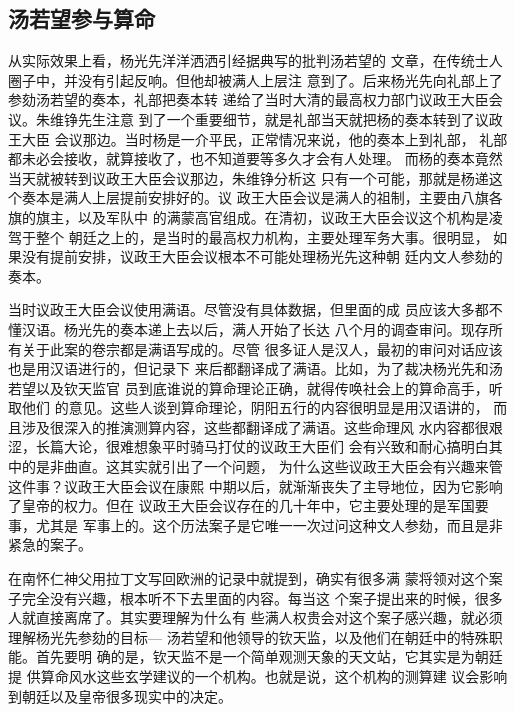 \subsection{汤若望参与算命}
\par
从实际效果上看，杨光先洋洋洒洒引经据典写的批判汤若望的%
文章，在传统士人圈子中，并没有引起反响。但他却被满人上层注%
意到了。后来杨光先向礼部上了参劾汤若望的奏本，礼部把奏本转%
递给了当时大清的最高权力部门议政王大臣会议。朱维铮先生注意%
到了一个重要细节，就是礼部当天就把杨的奏本转到了议政王大臣%
会议那边。当时杨是一介平民，正常情况来说，他的奏本上到礼部，%
礼部都未必会接收，就算接收了，也不知道要等多久才会有人处理。%
而杨的奏本竟然当天就被转到议政王大臣会议那边，朱维铮分析这%
只有一个可能，那就是杨递这个奏本是满人上层提前安排好的。议%
政王大臣会议是满人的祖制，主要由八旗各旗的旗主，以及军队中%
的满蒙高官组成。在清初，议政王大臣会议这个机构是凌驾于整个%
朝廷之上的，是当时的最高权力机构，主要处理军务大事。很明显，%
如果没有提前安排，议政王大臣会议根本不可能处理杨光先这种朝%
廷内文人参劾的奏本。%
\par
当时议政王大臣会议使用满语。尽管没有具体数据，但里面的成%
员应该大多都不懂汉语。杨光先的奏本递上去以后，满人开始了长达%
八个月的调查审问。现存所有关于此案的卷宗都是满语写成的。尽管%
很多证人是汉人，最初的审问对话应该也是用汉语进行的，但记录下%
来后都翻译成了满语。比如，为了裁决杨光先和汤若望以及钦天监官%
员到底谁说的算命理论正确，就得传唤社会上的算命高手，听取他们%
的意见。这些人谈到算命理论，阴阳五行的内容很明显是用汉语讲的，%
而且涉及很深入的推演测算内容，这些都翻译成了满语。这些命理风%
水内容都很艰涩，长篇大论，很难想象平时骑马打仗的议政王大臣们%
会有兴致和耐心搞明白其中的是非曲直。这其实就引出了一个问题，%
为什么这些议政王大臣会有兴趣来管这件事？议政王大臣会议在康熙%
中期以后，就渐渐丧失了主导地位，因为它影响了皇帝的权力。但在%
议政王大臣会议存在的几十年中，它主要处理的是军国要事，尤其是%
军事上的。这个历法案子是它唯一一次过问这种文人参劾，而且是非%
紧急的案子。%
\par
在南怀仁神父用拉丁文写回欧洲的记录中就提到，确实有很多满%
蒙将领对这个案子完全没有兴趣，根本听不下去里面的内容。每当这%
个案子提出来的时候，很多人就直接离席了。其实要理解为什么有%
些满人权贵会对这个案子感兴趣，就必须理解杨光先参劾的目标—%
汤若望和他领导的钦天监，以及他们在朝廷中的特殊职能。首先要明%
确的是，钦天监不是一个简单观测天象的天文站，它其实是为朝廷提%
供算命风水这些玄学建议的一个机构。也就是说，这个机构的测算建%
议会影响到朝廷以及皇帝很多现实中的决定。%
